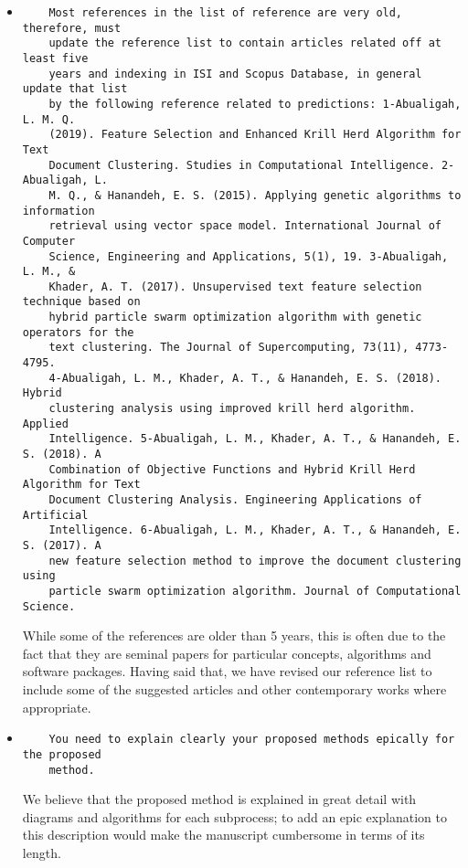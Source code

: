 \documentclass[11pt]{article}
\begin{document}
\begin{itemize}
\item
\begin{verbatim}
    Most references in the list of reference are very old, therefore, must
    update the reference list to contain articles related off at least five
    years and indexing in ISI and Scopus Database, in general update that list
    by the following reference related to predictions: 1-Abualigah, L. M. Q.
    (2019). Feature Selection and Enhanced Krill Herd Algorithm for Text
    Document Clustering. Studies in Computational Intelligence. 2-Abualigah, L.
    M. Q., & Hanandeh, E. S. (2015). Applying genetic algorithms to information
    retrieval using vector space model. International Journal of Computer
    Science, Engineering and Applications, 5(1), 19. 3-Abualigah, L. M., &
    Khader, A. T. (2017). Unsupervised text feature selection technique based on
    hybrid particle swarm optimization algorithm with genetic operators for the
    text clustering. The Journal of Supercomputing, 73(11), 4773-4795.
    4-Abualigah, L. M., Khader, A. T., & Hanandeh, E. S. (2018). Hybrid
    clustering analysis using improved krill herd algorithm. Applied
    Intelligence. 5-Abualigah, L. M., Khader, A. T., & Hanandeh, E. S. (2018). A
    Combination of Objective Functions and Hybrid Krill Herd Algorithm for Text
    Document Clustering Analysis. Engineering Applications of Artificial
    Intelligence. 6-Abualigah, L. M., Khader, A. T., & Hanandeh, E. S. (2017). A
    new feature selection method to improve the document clustering using
    particle swarm optimization algorithm. Journal of Computational Science.
\end{verbatim}

While some of the references are older than 5 years, this is often due to the
fact that they are seminal papers for particular concepts, algorithms and
software packages. Having said that, we have revised our reference list to
include some of the suggested articles and other contemporary works where
appropriate.


\item
\begin{verbatim}
    You need to explain clearly your proposed methods epically for the proposed
    method.
\end{verbatim}

We believe that the proposed method is explained in great detail with diagrams
and algorithms for each subprocess; to add an epic explanation to this
description would make the manuscript cumbersome in terms of its length.


\end{itemize}
\end{document}
